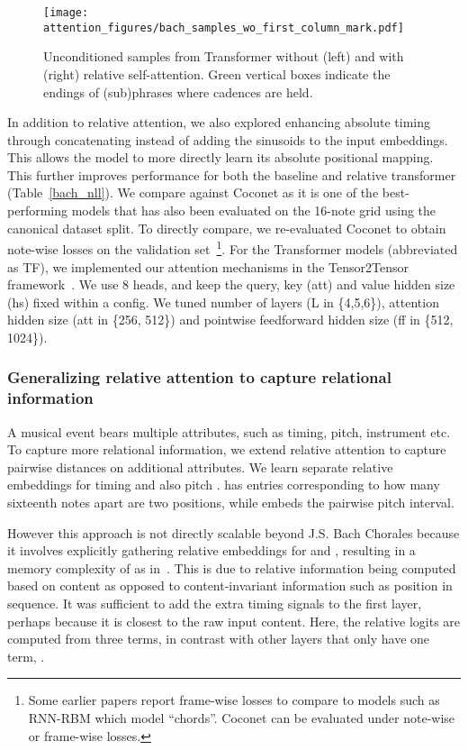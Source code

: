 \documentclass{article} \usepackage{iclr2019_conference,times}
\begin{document}
\begin{figure}[H]
\vskip -0.05in
\begin{center}
\centerline{\texttt{[image: attention\_figures/bach\_samples\_wo\_first\_column\_mark.pdf]}}
\caption{Unconditioned samples from Transformer without (left) and with (right) relative self-attention. Green vertical boxes indicate the endings of (sub)phrases where cadences are held.}
\label{fig:bach_sample}
\end{center}
\vskip -0.2in
\end{figure}


In addition to relative attention, we also explored enhancing absolute timing through concatenating instead of adding the sinusoids to the input embeddings.  This allows the model to more directly learn its absolute positional mapping.  This further improves performance for both the baseline and relative transformer (Table~\ref{bach_nll}). 
We compare against {\sc Coconet} as it is one of the best-performing models that has also been evaluated on the 16-note grid using the canonical dataset split.
To directly compare, we re-evaluated {\sc Coconet} to obtain note-wise losses on the validation set~\footnote{Some earlier papers report frame-wise losses to compare to models such as RNN-RBM which model ``chords''.  Coconet can be evaluated under note-wise or frame-wise losses.}.
For the Transformer models (abbreviated as {\sc TF}), 
we implemented our attention mechanisms in the Tensor2Tensor framework~\citep{tensor2tensor}.  We use 8 heads, and keep the query, key (att) and value hidden size (hs) fixed within a config.
We tuned number of layers (L in \{4,5,6\}), attention hidden size (att in \{256, 512\}) and pointwise feedforward hidden size (ff in \{512, 1024\}).



\subsubsection{Generalizing relative attention to capture relational information}
A musical event bears multiple attributes, such as timing, pitch, instrument etc.  To capture more relational information, we extend relative attention to capture pairwise distances on additional attributes. We learn separate relative embeddings for timing  and also pitch .   has entries corresponding to how many sixteenth notes apart are two positions, while  embeds the pairwise pitch interval.
\iffalse
We call this relative music attention, where additional relative terms can be added to modulate attention (Equation~\ref{music_attention}). 
\fi
However this approach is not directly scalable beyond J.S. Bach Chorales because it involves explicitly gathering relative embeddings for  and , resulting in a memory complexity of  as in~\cite{shaw2018self}.  This is due to relative information being computed based on content as opposed to content-invariant information such as position in sequence.  
It was sufficient to add the extra timing signals to the first layer, perhaps because it is closest to the raw input content. Here, the relative logits are computed from three terms,  in contrast with other layers that only have one term, .
\end{document}
